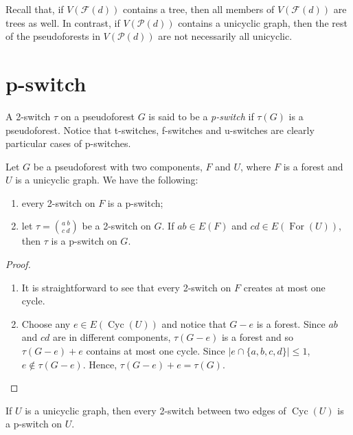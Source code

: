 \documentclass{BICA}
\newcommand{\Forest}{\operatorname{For}}
\newcommand{\Cycles}{\operatorname{Cyc}}
\begin{document}
Recall that, if $V(\mathcal{F}(d))$ contains a tree, then all members of $V(\mathcal{F}(d))$ are trees as well. In contrast, if $V(\mathcal{P}(d))$ contains a unicyclic graph, then the rest of the pseudoforests in $V(\mathcal{P}(d))$ are not necessarily all unicyclic.

\section{p-switch}\label{sec-p-switch}

A 2-switch $\tau$ on a pseudoforest $G$ is said to be a \emph{p-switch} if $\tau(G)$ is a pseudoforest. Notice that t-switches, f-switches and u-switches are clearly particular cases of p-switches.

\begin{lemma}
	\label{lem2switchpswitch}
	Let $G$ be a pseudoforest with two components, $F$ and $U$, where $F$ is a forest and $U$ is a unicyclic graph. We have the following:
	\begin{enumerate}
		\item every 2-switch on $F$ is a p-switch;

		\item let $\tau= {{a \ b}\choose{c \ d}}$ be a 2-switch on $G$. If $ab\in E(F)$ and $cd\in E(\Forest(U))$, then $\tau$ is a p-switch on $G$.
	\end{enumerate}
\end{lemma}

\begin{proof}
	\begin{enumerate}[label=(\arabic*).]
		\item It is straightforward to see that every 2-switch on $F$ creates at most one cycle.

		\item Choose any $e\in E(\Cycles(U))$ and notice that $G-e$ is a forest. Since $ab$ and $cd$ are in different components, $\tau(G-e)$ is a forest and so $\tau(G-e)+e$ contains at most one cycle. Since $|e\cap \{a,b,c,d\}|\leq 1$, $e\notin\tau(G-e)$. Hence, $\tau(G-e)+e=\tau(G)$. \qedhere
	\end{enumerate}
\end{proof}

\begin{lemma}
	\label{2switch.in.C_U=pswitch.in.U}
     If $U$ is a unicyclic graph, then every 2-switch between two edges of $\Cycles(U)$ is a p-switch on $U$.
\end{lemma}
\end{document}
